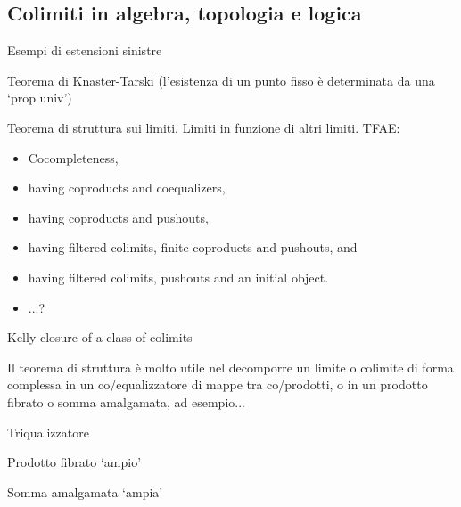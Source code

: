 \subsection{Colimiti in algebra, topologia e logica}
\begin{example}
\end{example}
\begin{example}
	\Todo{}
\end{example}
\begin{example}
\end{example}
\begin{example}
\end{example}
\begin{example}
\end{example}
\begin{example}
\end{example}
\begin{example}
\end{example}
\begin{example}
\end{example}
\begin{example}
\end{example}
\begin{examples}
	Esempi di estensioni sinistre
\end{examples}
\begin{theorem}
	Teorema di Knaster-Tarski (l'esistenza di un punto fisso è determinata da una `prop univ')
\end{theorem}
\begin{theorem}
	Teorema di struttura sui limiti. Limiti in funzione di altri limiti. TFAE:
	\begin{itemize}
		\item 	Cocompleteness,
		\item having coproducts and coequalizers,
		\item having coproducts and pushouts,
		\item having filtered colimits, finite coproducts and pushouts, and
		\item having filtered colimits, pushouts and an initial object.
		\item ...?
	\end{itemize}
	Kelly closure of a class of colimits
\end{theorem}
Il teorema di struttura è molto utile nel decomporre un limite o colimite di forma complessa in un co/equalizzatore di mappe tra co/prodotti, o in un prodotto fibrato o somma amalgamata, ad esempio...
\begin{example}
	Triqualizzatore
\end{example}
\begin{example}
	Prodotto fibrato `ampio'
\end{example}
\begin{example}
	Somma amalgamata `ampia'
\end{example}
